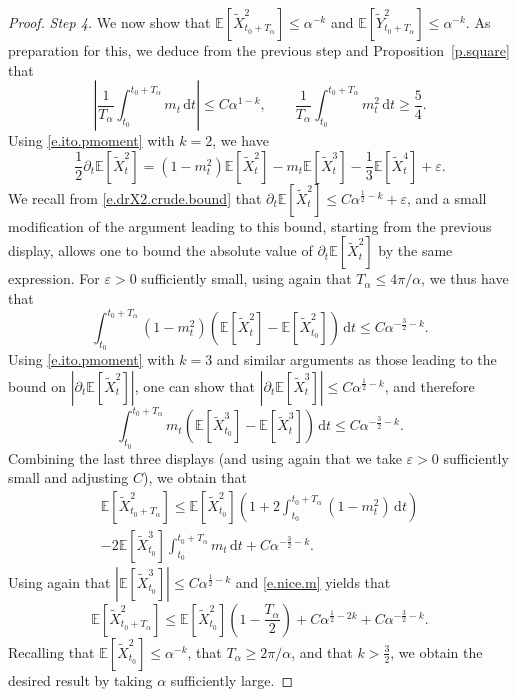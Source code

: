 \documentclass[11pt]{amsart}
\theoremstyle{remark}
\theoremstyle{definition}
\numberwithin{equation}{section}
\numberwithin{proposition}{section}
\newcommand{\ep}{\varepsilon}
\renewcommand{\le}{\leqslant}
\renewcommand{\ge}{\geqslant}
\newcommand{\td}{\widetilde}
\newcommand{\Ll}{\left}
\newcommand{\Rr}{\right}
\renewcommand{\d}{\mathrm{d}}
\newcommand{\dr}{\partial}
\newcommand{\1}{\mathbf{1}}
\newcommand{\al}{\alpha}
\newcommand{\E}{\mathbb E}
\begin{document}
\begin{proof}
\noindent \emph{Step 4.} We now show that $\E[\td X_{t_0 + T_\al}^2] \le \al^{-k}$ and $\E[\td Y_{t_0 + T_\al}^2] \le \al^{-k}$. As preparation for this, we deduce from the previous step and Proposition~\ref{p.square} that
\begin{equation}  
\label{e.nice.m}
\Ll| \frac 1 {T_\al} \int_{t_0}^{t_0 + T_\al} m_t \, \d t \Rr| \le C \al^{1-k}, \qquad \frac 1 {T_\al} \int_{t_0}^{t_0 + T_\al} m_t^2 \, \d t \ge \frac 5 4.
\end{equation}
Using \eqref{e.ito.pmoment} with $k = 2$, we have
\begin{equation*}  %
\frac 1 2 \dr_t \E[\td X_t^2] = (1-m_t^2) \E[\td X_t^2] - m_t \E[\td X_t^3] - \frac 1 3 \E[\td X_t^4] + \ep.
\end{equation*}
We recall from \eqref{e.drX2.crude.bound} that $\dr_t \E[\td X_t^2] \le C \al^{\frac 1 2 - k} + \ep$, and a small modification of the argument leading to this bound, starting from the previous display, allows one to bound the absolute value of $\dr_t \E[\td X_t^2]$ by the same expression. For $\ep > 0$ sufficiently small, using again that $T_\al \le 4\pi/\al$, we thus have that
\begin{equation*}  %
\int_{t_0}^{t_0 + T_\al}(1-m_t^2)\Ll( \E[\td X_t^2] - \E[\td X_{t_0}^2]\Rr)\, \d t \le C \al^{-\frac 3 2 - k}.
\end{equation*}
Using \eqref{e.ito.pmoment} with $k = 3$ and similar arguments as those leading to the bound on $|\dr_t \E[\td X_t^2]|$, one can show that $|\dr_t \E[\td X_t^3]| \le C \al^{\frac 1 2 - k}$, and therefore
\begin{equation*}  %
\int_{t_0}^{t_0 + T_\al} m_t \Ll( \E[\td X_{t_0}^3] - \E[\td X_{t}^3] \Rr) \, \d t \le C \al^{-\frac 3 2 - k}.
\end{equation*}
Combining the last three displays (and using again that we take $\ep > 0$ sufficiently small and adjusting $C$), we obtain that 
\begin{multline*}  %
\E[\td X_{t_0 + T_\al}^2] 
\le \E[\td X_{t_0}^2]\Ll(1 + 2 \int_{t_0}^{t_0 + T_\al} (1-m_t^2)\, \d t \Rr) 
\\
- 2 \E[\td X_{t_0}^3] \int_{t_0}^{t_0 + T_\al} m_t \, \d t + C \al^{-\frac 3 2 - k}.
\end{multline*}
Using again that $|\E[\td X_{t_0}^3]| \le C \al^{\frac 1 2 - k}$ and \eqref{e.nice.m} yields that
\begin{equation*}  %
\E[\td X_{t_0 + T_\al}^2] \le \E[\td X_{t_0}^2] \Ll( 1 - \frac{T_\al}{2} \Rr) + C \al^{\frac 1 2 - 2k} + C \al^{-\frac 3 2 - k}.
\end{equation*}
Recalling that $\E[\td X_{t_0}^2] \le \al^{-k}$, that $T_\al \ge 2\pi/\al$, and that $k > \frac 3 2$, we obtain the desired result by taking $\al$ sufficiently large.
\end{proof}
\end{document}
